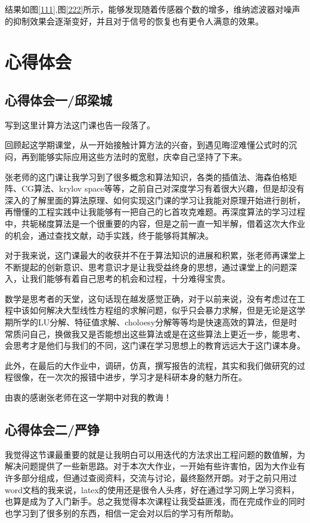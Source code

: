结果如图\ref{111},图\ref{222}所示，能够发现随着传感器个数的增多，维纳滤波器对噪声的抑制效果会逐渐变好，并且对于信号的恢复也有更令人满意的效果。


\section{心得体会}
\subsection{心得体会一/邱梁城}
写到这里计算方法这门课也告一段落了。

回顾起这学期课堂，从一开始接触计算方法的兴奋，到遇见晦涩难懂公式时的沉闷，再到能够实际应用这些方法时的宽慰，庆幸自己坚持了下来。

张老师的这门课让我学习到了很多概念和算法知识，各类的插值法、海森伯格矩阵、CG算法、krylov space等等，之前自己对深度学习有着很大兴趣，但是却没有深入的了解里面的算法原理、如何实现这门课的学习让我能对原理开始进行剖析，再懵懂的工程实践中让我能够有一把自己的匕首攻克难题。再深度算法的学习过程中，共轭梯度算法是一个很重要的内容，但是之前一直一知半解，借着这次大作业的机会，通过查找文献，动手实践，终于能够将其解决。

对于我来说，这门课最大的收获并不在于算法知识的进展和积累，张老师再课堂上不断提起的创新意识、思考意识才是让我受益终身的思想，通过课堂上的问题深入，让我们能够有着自己思考的机会和过程，十分难得宝贵。

数学是思考者的天堂，这句话现在越发感觉正确，对于以前来说，没有考虑过在工程中该如何解决大型线性方程组的求解问题，似乎只会暴力求解，但是无论是这学期所学的LU分解、特征值求解、choloesy分解等等均是快速高效的算法，但是时常质问自己，换做我又是否能想出这些算法或是在这些算法上更近一步，能思考、会思考才是他们与我们的不同，这门课在学习思想上的教育远远大于这门课本身。


此外，在最后的大作业中，调研，仿真，撰写报告的流程，其实和我们做研究的过程很像，在一次次的报错中进步，学习才是科研本身的魅力所在。

由衷的感谢张老师在这一学期中对我的教诲！
\subsection{心得体会二/严铮}
我觉得这节课最重要的就是让我明白可以用迭代的方法求出工程问题的数值解，为解决问题提供了一些新思路。对于本次大作业，一开始有些许害怕，因为大作业有许多部分组成，但通过查阅资料，交流与讨论，最终豁然开朗。对于之前只用过word文档的我来说，latex的使用还是很令人头疼，好在通过学习网上学习资料，也算是成为了入门新手。总之我觉得本次课程让我受益匪浅，而在完成作业的同时也学习到了很多别的东西，相信一定会对以后的学习有所帮助。


